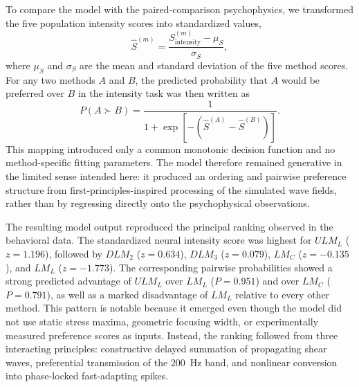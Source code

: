 \documentclass[pdflatex, sn-nature]{sn-jnl}
\theoremstyle{thmstyleone}%
\theoremstyle{thmstyletwo}%
\theoremstyle{thmstylethree}%
\begin{document}
To compare the model with the paired-comparison psychophysics, we transformed the five population intensity scores into standardized values,
\begin{equation}
    \hat{S}^{(m)}=\frac{S^{(m)}_{\mathrm{intensity}}-\mu_S}{\sigma_S},
\end{equation}
where $\mu_S$ and $\sigma_S$ are the mean and standard deviation of the five method scores. For any two methods $A$ and $B$, the predicted probability that $A$ would be preferred over $B$ in the intensity task was then written as
\begin{equation}
    P(A \succ B)=\frac{1}{1+\exp\left[-\left(\hat{S}^{(A)}-\hat{S}^{(B)}\right)\right]}.
\end{equation}
This mapping introduced only a common monotonic decision function and no method-specific fitting parameters. The model therefore remained generative in the limited sense intended here: it produced an ordering and pairwise preference structure from first-principles-inspired processing of the simulated wave fields, rather than by regressing directly onto the psychophysical observations.

The resulting model output reproduced the principal ranking observed in the behavioral data. The standardized neural intensity score was highest for $ULM_L$ ($z=1.196$), followed by $DLM_2$ ($z=0.634$), $DLM_3$ ($z=0.079$), $LM_C$ ($z=-0.135$), and $LM_L$ ($z=-1.773$). The corresponding pairwise probabilities showed a strong predicted advantage of $ULM_L$ over $LM_L$ ($P=0.951$) and over $LM_C$ ($P=0.791$), as well as a marked disadvantage of $LM_L$ relative to every other method. This pattern is notable because it emerged even though the model did not use static stress maxima, geometric focusing width, or experimentally measured preference scores as inputs. Instead, the ranking followed from three interacting principles: constructive delayed summation of propagating shear waves, preferential transmission of the \qty{200}{\hertz} band, and nonlinear conversion into phase-locked fast-adapting spikes.
\end{document}
